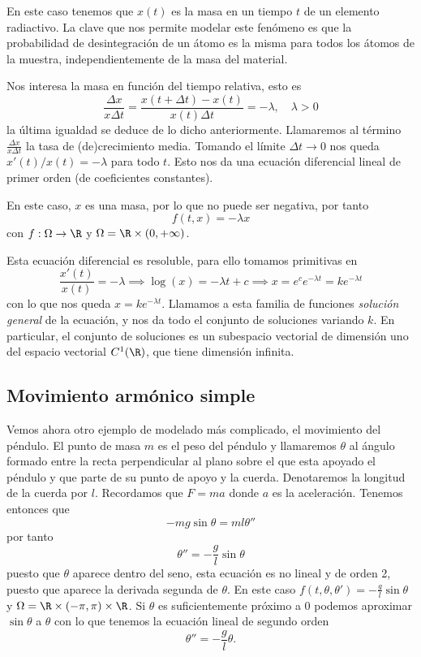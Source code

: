 \documentclass[../ecuaciones_diferenciales.tex]{subfiles}
\begin{document}
En este caso tenemos que \(x(t)\) es
la masa en un tiempo \(t\) de un elemento radiactivo. La clave que nos permite
modelar este fenómeno es que la probabilidad de desintegración de un átomo es la
misma para todos los átomos de la muestra, independientemente de la masa del
material.

Nos interesa la masa en función del tiempo relativa, esto es
\[\frac{\Delta x}{x \Delta t} = \frac{x(t + \Delta t) - x(t)}{x(t) \Delta t}
	= -\lambda, \quad \lambda > 0\] la última igualdad se deduce de lo dicho
anteriormente. Llamaremos al término \(\frac{\Delta x}{x\Delta t}\) la tasa de
(de)crecimiento media. Tomando el límite \(\Delta t \to 0\) nos queda
\(x'(t)/x(t) = -\lambda\) para todo \(t\). Esto nos da una ecuación diferencial
lineal de primer orden (de coeficientes constantes).

En este caso, \(x\) es una masa, por lo que no puede ser negativa, por tanto
\[f(t, x) = -\lambda x\]
con \(f : \Omega \to \R\) y \(\Omega = \R \times (0, +\infty)\).

Esta ecuación diferencial es resoluble, para ello tomamos primitivas en
\[\frac{x'(t)}{x(t)} = -\lambda \implies \log(x) = -\lambda t + c
	\implies x = e^c e^{-\lambda t} = k e^{-\lambda t}\] con lo que nos queda
\(x = k e^{-\lambda t}\). Llamamos a esta familia de funciones \emph{solución general}
de la ecuación, y nos da todo el conjunto de soluciones variando \(k\). En
particular, el conjunto de soluciones es un subespacio vectorial de dimensión
uno del espacio vectorial \(C^1(\R)\), que tiene dimensión infinita.

\subsection{Movimiento armónico simple}

Vemos ahora otro ejemplo de modelado más complicado, el movimiento del péndulo.
El punto de masa \(m\) es el peso del péndulo y llamaremos \(\theta\) al ángulo
formado entre la recta perpendicular al plano sobre el que esta apoyado el
péndulo y que parte de su punto de apoyo y la cuerda. Denotaremos la longitud
de la cuerda por \(l\). Recordamos que \(F = ma\) donde \(a\) es la aceleración.
Tenemos entonces que
\[-m g \sin\theta = m l \theta''\]
por tanto
\[\theta'' = -\frac{g}{l} \sin\theta\]
puesto que \(\theta\) aparece dentro del seno, esta ecuación es no lineal y de
orden 2, puesto que aparece la derivada segunda de \(\theta\). En este caso
\(f(t, \theta, \theta') = -\frac{g}{l} \sin\theta\) y \(\Omega = \R \times
(-\pi, \pi) \times \R\). Si \(\theta\) es suficientemente próximo a \(0\)
podemos aproximar \(\sin\theta\) a \(\theta\) con lo que tenemos la ecuación
lineal de segundo orden
\[\theta'' = -\frac{g}{l}\theta.\]
\end{document}
